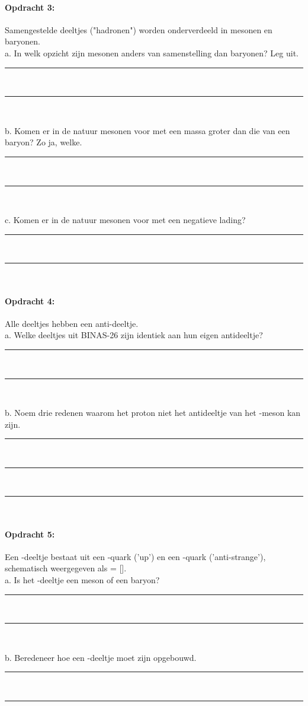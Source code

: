 \paragraph{Opdracht 3:}
Samengestelde deeltjes ("hadronen") worden onderverdeeld in mesonen en baryonen.\\
a. In welk opzicht zijn mesonen anders van samenstelling dan baryonen? Leg uit.
\begin{center}
    \rule{\textwidth}{0.3mm}\\
    \rule{\textwidth}{0.3mm}\\
\end{center}
b. Komen er in de natuur mesonen voor met een massa groter dan die van een baryon?
Zo ja, welke.
\begin{center}
    \rule{\textwidth}{0.3mm}\\
    \rule{\textwidth}{0.3mm}\\
\end{center}
c. Komen er in de natuur mesonen voor met een negatieve lading?
\begin{center}
    \rule{\textwidth}{0.3mm}\\
    \rule{\textwidth}{0.3mm}\\
\end{center}
\paragraph{Opdracht 4:}
Alle deeltjes hebben een anti-deeltje.\\
a. Welke deeltjes uit BINAS-26 zijn identiek aan hun eigen antideeltje?
\begin{center}
    \rule{\textwidth}{0.3mm}\\
    \rule{\textwidth}{0.3mm}\\
\end{center}
b. Noem drie redenen waarom het proton niet het antideeltje van het \Ppiplus-meson kan zijn.
\begin{center}
    \rule{\textwidth}{0.3mm}\\
    \rule{\textwidth}{0.3mm}\\
    \rule{\textwidth}{0.3mm}\\
\end{center}

\paragraph{Opdracht 5:}
Een \PKplus -deeltje bestaat uit een \Pup -quark ('up') en een \APqs-quark 
('anti-strange'), schematisch weergegeven als \PKplus = [\Pup\APqs].\\
a. Is het \PKplus -deeltje een meson of een baryon?
\begin{center}
    \rule{\textwidth}{0.3mm}\\
    \rule{\textwidth}{0.3mm}\\
\end{center}
b. Beredeneer hoe een \PKm-deeltje moet zijn opgebouwd.
\begin{center}
    \rule{\textwidth}{0.3mm}\\
    \rule{\textwidth}{0.3mm}\\   
\end{center}

